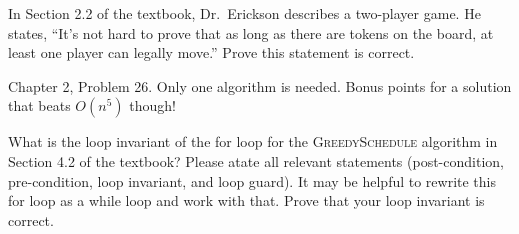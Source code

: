 \documentclass{article}
\begin{document}
In Section 2.2 of the textbook, Dr.~Erickson describes a two-player game.
He states, ``It's not hard to prove that
as long as there are tokens on the board, at least one player can legally
move.''  Prove this statement is correct.


\collab{\todo{}}

Chapter 2, Problem 26.  Only one algorithm is needed.  Bonus points for a
solution that beats $O(n^5)$ though!

\collab{\todo{}}

What is the loop invariant of the for loop for the \textsc{GreedySchedule}
algorithm in Section 4.2 of the textbook?  Please atate all relevant statements
(post-condition, pre-condition, loop invariant, and loop guard).  It may be
helpful to rewrite this for loop as a while loop and work with that.  Prove that
your loop invariant is correct.
\end{document}
